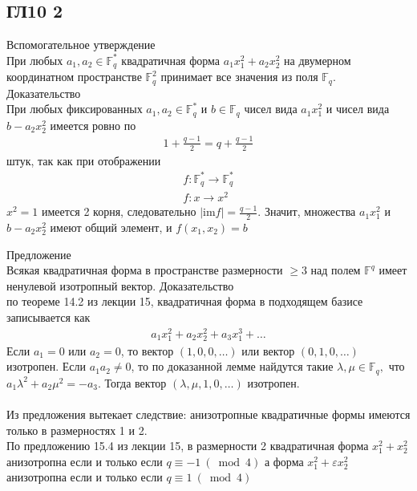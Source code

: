 \subsection*{ГЛ10 2}
Вспомогательное утверждение\\
При любых $a_1, a_2 \in \mathbb{F}^*_q$ квадратичная форма $a_1x_1^2 + a_2x_2^2$ на двумерном координатном пространстве $\mathbb{F}^2_q$  принимает все значения из поля $\mathbb{F}_q$.
\vskip 0.2in
\noindent
Доказательство\\
При любых фиксированных $a_1, a_2 \in \mathbb{F}^*_q$ и $b \in \mathbb{F}_q$ чисел вида $a_1x_1^2$ и чисел вида $b - a_2x_2^2$ имеется ровно по
\begin{gather*}
	1+\frac{q-1}{2} = q+\frac{q-1}{2}
\end{gather*} 
штук, так как при отображении
\begin{gather*}
	f: \mathbb{F}^*_q \rightarrow \mathbb{F}^*_q\\ 
	f: x \rightarrow x^2
\end{gather*}
$x^2=1$ имеется 2 корня, следовательно $\displaystyle |\text{im} f|=\frac{q-1}{2}$. Значит, множества $a_1x_1^2$ и $b - a_2x_2^2$ имеют общий элемент, и $f(x_1, x_2)=b$

\vskip 0.2in
\noindent
Предложение\\
Всякая квадратичная форма в пространстве размерности $\geqslant 3$ над полем $\mathbb{F}^q$ имеет ненулевой изотропный вектор.
\vskip 0.2in
\noindent
Доказательство\\
по теореме 14.2 из лекции 15, квадратичная форма в подходящем базисе записывается как 
\begin{gather*}
	a_1x_1^2+a_2x_2^2+a_3x_1^3+ \ldots
\end{gather*}
Если $a_1=0$ или $a_2=0$, то вектор $(1, 0, 0, \ldots)$ или вектор $(0, 1, 0, \ldots)$ изотропен. Если $a_1a_2 \neq 0$, то по доказанной лемме найдутся такие $\lambda, \mu \in \mathbb{F}_{q},$ что $a_{1} \lambda^{2}+a_{2} \mu^{2}=-a_{3}$. Тогда вектор $(\lambda, \mu, 1,0, \ldots)$ изотропен.\\
\\
Из предложения вытекает следствие: анизотропные квадратичные формы имеются только в размерностях 1 и 2.\\ 
По предложению 15.4 из лекции 15, в размерности 2 квадратичная форма $x_{1}^{2}+x_{2}^{2}$ анизотропна если и только если $q \equiv-1\ (\bmod 4)$ а форма $x_{1}^{2}+\varepsilon x_{2}^{2}$ анизотропна если и только если $q \equiv 1\ (\bmod 4)$
		